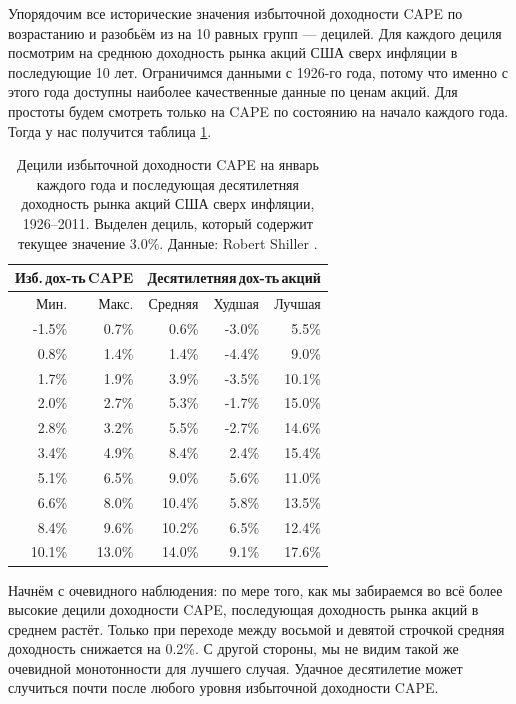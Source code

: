 Упорядочим все исторические значения избыточной доходности CAPE по возрастанию и разобьём из на 10 равных групп --- децилей. Для каждого дециля посмотрим на среднюю доходность рынка акций США сверх инфляции в последующие 10 лет. Ограничимся данными с 1926-го года, потому что именно с этого года доступны наиболее качественные данные по ценам акций. Для простоты будем смотреть только на CAPE по состоянию на начало каждого года. Тогда у нас получится таблица \ref{cape_excess_yield_and_stock_returns_table}.

\begin{table}[ht]
\centering
\begin{tabular}{r|r|r|r|r}
\multicolumn{2}{c|}{Изб.\,дох-ть\,CAPE} &
\multicolumn{3}{c}{Десятилетняя\,дох-ть\,акций} \\
\hline
Мин. & Макс. & Средняя & Худшая & Лучшая \\
\hline
-1.5\% &  0.7\% &  0.6\% & -3.0\% &  5.5\% \\
 0.8\% &  1.4\% &  1.4\% & -4.4\% &  9.0\% \\
 1.7\% &  1.9\% &  3.9\% & -3.5\% & 10.1\% \\
 2.0\% &  2.7\% &  5.3\% & -1.7\% & 15.0\% \\
\hline
 2.8\% &  3.2\% &  5.5\% & -2.7\% & 14.6\% \\
\hline
 3.4\% &  4.9\% &  8.4\% &  2.4\% & 15.4\% \\
 5.1\% &  6.5\% &  9.0\% &  5.6\% & 11.0\% \\
 6.6\% &  8.0\% & 10.4\% &  5.8\% & 13.5\% \\
 8.4\% &  9.6\% & 10.2\% &  6.5\% & 12.4\% \\
10.1\% & 13.0\% & 14.0\% &  9.1\% & 17.6\%        
\end{tabular}
\caption{Децили избыточной доходности CAPE на январь каждого года и последующая десятилетняя доходность рынка акций США сверх инфляции, 1926--2011. Выделен дециль, который содержит текущее значение 3.0\%. Данные: Robert Shiller \cite{shillerOnline}.}
\label{cape_excess_yield_and_stock_returns_table}
\end{table}

Начнём с очевидного наблюдения: по мере того, как мы забираемся во всё более высокие децили доходности CAPE, последующая доходность рынка акций в среднем растёт. Только при переходе между восьмой и девятой строчкой средняя доходность снижается на 0.2\%. С другой стороны, мы не видим такой же очевидной монотонности для лучшего случая. Удачное десятилетие может случиться почти после любого уровня избыточной доходности CAPE.

